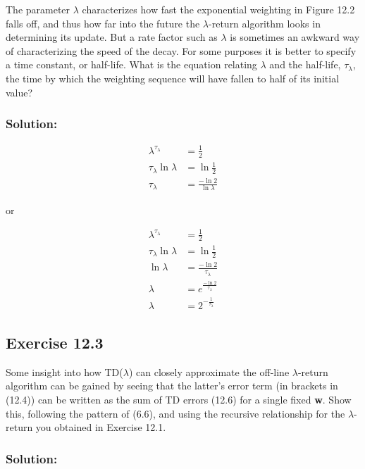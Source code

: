 The parameter $\lambda$ characterizes how fast the exponential weighting in
Figure 12.2 falls off, and thus how far into the future the  $\lambda$-return algorithm looks in
determining its update. But a rate factor such as $\lambda$ is sometimes an awkward way of
characterizing the speed of the decay. For some purposes it is better to specify a time
constant, or half-life. What is the equation relating $\lambda$ and the half-life, $\tau_\lambda$, the time by
which the weighting sequence will have fallen to half of its initial value? 

\subsubsection*{Solution:}

\begin{align*}
    \lambda^{\tau_\lambda} &= \frac{1}{2} \\
    \tau_\lambda \ln \lambda &= \ln \frac{1}{2} \\
    \tau_\lambda &= \frac{-\ln 2}{\ln \lambda} 
\end{align*}

or

\begin{align*}
    \lambda^{\tau_\lambda} &= \frac{1}{2} \\
    \tau_\lambda \ln \lambda &= \ln \frac{1}{2} \\
    \ln \lambda &= \frac{-\ln 2}{\tau_\lambda} \\
    \lambda &= e^{\frac{-\ln 2}{\tau_\lambda}} \\
    \lambda &= 2^{-\frac{1}{\tau_\lambda}} 
\end{align*}

\subsection*{Exercise 12.3}
Some insight into how TD($\lambda$) can closely approximate the off-line  $\lambda$-return
algorithm can be gained by seeing that the latter's error term (in brackets in (12.4)) can
be written as the sum of TD errors (12.6) for a single fixed \textbf{w}. Show this, following the
pattern of (6.6), and using the recursive relationship for the $\lambda$-return you obtained in
Exercise 12.1.

\subsubsection*{Solution:}

